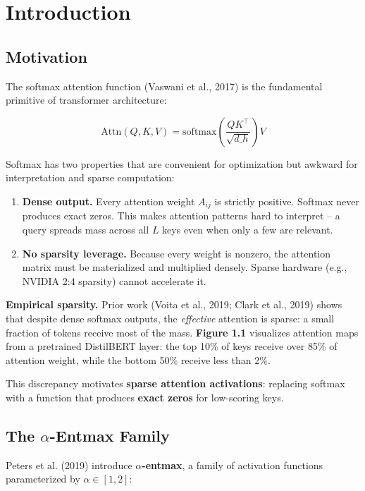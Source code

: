 
\section{Introduction}

\subsection{Motivation}

The softmax attention function (Vaswani et al., 2017) is the fundamental 
primitive of transformer architecture:

\[
\text{Attn}(Q, K, V) = \text{softmax}\!\left(\frac{Q K^\top}{\sqrt{d\_h}}\right) V
\tag{1.1}
\]

Softmax has two properties that are convenient for optimization but awkward 
for interpretation and sparse computation:

\begin{enumerate}
\item \textbf{Dense output.} Every attention weight $A_{ij}$ is strictly positive.
  Softmax never produces exact zeros. This makes attention patterns hard
  to interpret -- a query spreads mass across all $L$ keys even when only
  a few are relevant.

\item \textbf{No sparsity leverage.} Because every weight is nonzero, the attention
  matrix must be materialized and multiplied densely. Sparse hardware
  (e.g., NVIDIA 2:4 sparsity) cannot accelerate it.

\end{enumerate}
\textbf{Empirical sparsity.} Prior work (Voita et al., 2019; Clark et al., 2019) 
shows that despite dense softmax outputs, the \textit{effective} attention is sparse: 
a small fraction of tokens receive most of the mass. \textbf{Figure 1.1} visualizes 
attention maps from a pretrained DistilBERT layer: the top 10\% of keys receive 
over 85\% of attention weight, while the bottom 50\% receive less than 2\%.

This discrepancy motivates \textbf{sparse attention activations}: replacing softmax 
with a function that produces \textbf{exact zeros} for low-scoring keys.

\subsection{The $\alpha$-Entmax Family}

Peters et al. (2019) introduce \textbf{$\alpha$-entmax}, a family of activation functions 
parameterized by $\alpha \in [1, 2]$:


